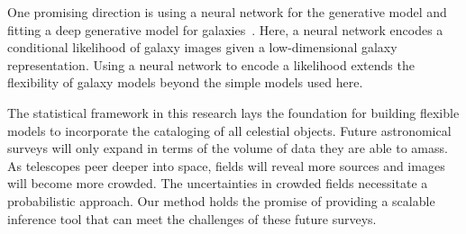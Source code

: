 One promising direction is using a neural network for the generative model and fitting a deep generative model for galaxies~\cite{Arcelin_2020, lanusse2020deep, Reiman_2019_gans_deblend, Regier2015ADG}. 
Here, a neural network encodes a conditional likelihood of galaxy images given a low-dimensional galaxy representation. 
Using a neural network to encode a likelihood extends the flexibility of galaxy models beyond the simple models used here. 




The statistical framework in this research lays the foundation for building flexible models to incorporate the cataloging of all celestial objects. 
Future astronomical surveys will only expand in terms of the volume of data they are able to amass. 
As telescopes peer deeper into space, fields will reveal more sources and images will become more crowded. 
The uncertainties in crowded fields necessitate a probabilistic approach. 
Our method holds the promise of providing  a scalable inference tool that can meet the challenges of these future surveys. 






